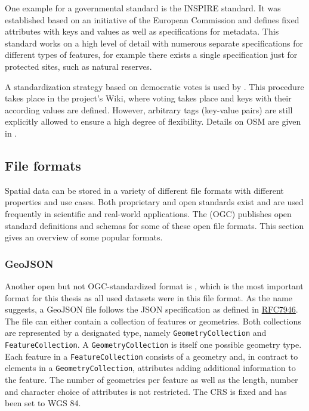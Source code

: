			One example for a governmental standard is the INSPIRE standard.
			It was established based on an initiative of the European Commission and defines fixed attributes with keys and values as well as specifications for metadata.
			This standard works on a high level of detail with numerous separate specifications for different types of features, for example there exists a single specification just for protected sites, such as natural reserves\cite[31]{inspire-protected-sites}.
		
			A standardization strategy based on democratic votes is used by .
			This procedure takes place in the project's Wiki, where voting takes place and keys with their according values are defined.
			However, arbitrary tags (key-value pairs) are still explicitly allowed to ensure a high degree of flexibility\cite{osm-wiki-proposal-process}.
			Details on OSM are given in .
			
	\subsection{File formats}
	\label{subsec:file-formats}
	
		Spatial data can be stored in a variety of different file formats with different properties and use cases.
		Both proprietary and open standards exist and are used frequently in scientific and real-world applications.
		The  (OGC) publishes open standard definitions and schemas for some of these open file formats.
		This section gives an overview of some popular formats.
		
		\subsubsection{GeoJSON}
		\label{subsubsec:geojson}
		
			Another open but not OGC-standardized format is , which is the most important format for this thesis as all used datasets were in this file format.
			As the name suggests, a GeoJSON file follows the JSON specification as defined in \href{https://datatracker.ietf.org/doc/html/rfc7946}{RFC7946}\cite{ietf-geojson}.
			The file can either contain a collection of features or geometries.
			Both collections are represented by a designated type, namely \texttt{GeometryCollection} and \texttt{FeatureCollection}.
			A \texttt{GeometryCollection} is itself one possible geometry type.
			Each feature in a \texttt{FeatureCollection} consists of a geometry and, in contract to elements in a \texttt{GeometryCollection}, attributes adding additional information to the feature.
			The number of geometries per feature as well as the length, number and character choice of attributes is not restricted.
			The CRS is fixed and has been set to WGS 84.
			
